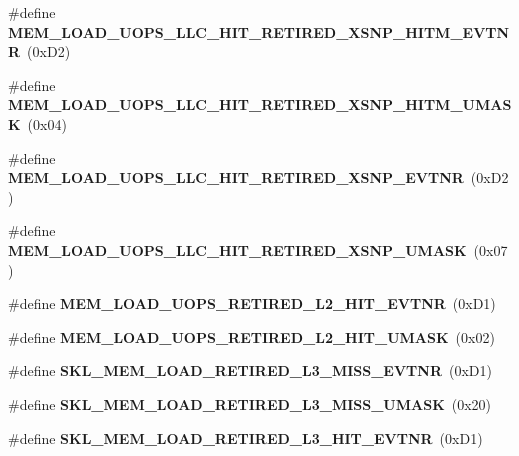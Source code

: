 \begin{DoxyCompactItemize}
\item 
\#define {\bfseries M\+E\+M\+\_\+\+L\+O\+A\+D\+\_\+\+U\+O\+P\+S\+\_\+\+L\+L\+C\+\_\+\+H\+I\+T\+\_\+\+R\+E\+T\+I\+R\+E\+D\+\_\+\+X\+S\+N\+P\+\_\+\+H\+I\+T\+M\+\_\+\+E\+V\+T\+NR}~(0x\+D2)\label{types_8h_ae9f23b3173042a0c8efad2e54a38604e}

\item 
\#define {\bfseries M\+E\+M\+\_\+\+L\+O\+A\+D\+\_\+\+U\+O\+P\+S\+\_\+\+L\+L\+C\+\_\+\+H\+I\+T\+\_\+\+R\+E\+T\+I\+R\+E\+D\+\_\+\+X\+S\+N\+P\+\_\+\+H\+I\+T\+M\+\_\+\+U\+M\+A\+SK}~(0x04)\label{types_8h_aa57e7eeacd4455a45e3f3855d7dda1b7}

\item 
\#define {\bfseries M\+E\+M\+\_\+\+L\+O\+A\+D\+\_\+\+U\+O\+P\+S\+\_\+\+L\+L\+C\+\_\+\+H\+I\+T\+\_\+\+R\+E\+T\+I\+R\+E\+D\+\_\+\+X\+S\+N\+P\+\_\+\+E\+V\+T\+NR}~(0x\+D2)\label{types_8h_a9ab609523dfe9b17befadca150ac310f}

\item 
\#define {\bfseries M\+E\+M\+\_\+\+L\+O\+A\+D\+\_\+\+U\+O\+P\+S\+\_\+\+L\+L\+C\+\_\+\+H\+I\+T\+\_\+\+R\+E\+T\+I\+R\+E\+D\+\_\+\+X\+S\+N\+P\+\_\+\+U\+M\+A\+SK}~(0x07)\label{types_8h_aea0a7bb3fb1eea7c1a7d5f396c8a02d6}

\item 
\#define {\bfseries M\+E\+M\+\_\+\+L\+O\+A\+D\+\_\+\+U\+O\+P\+S\+\_\+\+R\+E\+T\+I\+R\+E\+D\+\_\+\+L2\+\_\+\+H\+I\+T\+\_\+\+E\+V\+T\+NR}~(0x\+D1)\label{types_8h_afae78f9334d9a6158f1523eabbb25d3a}

\item 
\#define {\bfseries M\+E\+M\+\_\+\+L\+O\+A\+D\+\_\+\+U\+O\+P\+S\+\_\+\+R\+E\+T\+I\+R\+E\+D\+\_\+\+L2\+\_\+\+H\+I\+T\+\_\+\+U\+M\+A\+SK}~(0x02)\label{types_8h_a4090d60fa90984dc2932583c2a7ca545}

\item 
\#define {\bfseries S\+K\+L\+\_\+\+M\+E\+M\+\_\+\+L\+O\+A\+D\+\_\+\+R\+E\+T\+I\+R\+E\+D\+\_\+\+L3\+\_\+\+M\+I\+S\+S\+\_\+\+E\+V\+T\+NR}~(0x\+D1)\label{types_8h_a70f3a89ce397e08fc2de484925efc611}

\item 
\#define {\bfseries S\+K\+L\+\_\+\+M\+E\+M\+\_\+\+L\+O\+A\+D\+\_\+\+R\+E\+T\+I\+R\+E\+D\+\_\+\+L3\+\_\+\+M\+I\+S\+S\+\_\+\+U\+M\+A\+SK}~(0x20)\label{types_8h_a8d7d2702f3f7bd6c54fdc3ce7688de99}

\item 
\#define {\bfseries S\+K\+L\+\_\+\+M\+E\+M\+\_\+\+L\+O\+A\+D\+\_\+\+R\+E\+T\+I\+R\+E\+D\+\_\+\+L3\+\_\+\+H\+I\+T\+\_\+\+E\+V\+T\+NR}~(0x\+D1)\label{types_8h_ae28cf0ed4efd93a3c8d688b91c776be7}


\end{DoxyCompactItemize}
